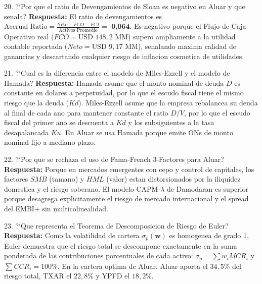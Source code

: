\documentclass[10pt,a4paper]{article}
\theoremstyle{definition}
\begin{document}
\begin{examquestion}{20. ?`Por que el ratio de Devengamientos de Sloan es negativo en Aluar y que senala?}
\textbf{Respuesta:} El ratio de devengamientos es $\text{Accrual Ratio} = \frac{\text{Neto} - FCO - FCI}{\text{Activos Promedio}} = \textbf{-0,064}$. Es negativo porque el Flujo de Caja Operativo real ($FCO = \text{USD } 148,2\text{ MM}$) supero ampliamente a la utilidad contable reportada ($Neto = \text{USD } 9,17\text{ MM}$), senalando maxima calidad de ganancias y descartando cualquier riesgo de inflacion cosmetica de utilidades.
\end{examquestion}

\begin{examquestion}{21. ?`Cual es la diferencia entre el modelo de Miles-Ezzell y el modelo de Hamada?}
\textbf{Respuesta:} Hamada asume que el monto nominal de deuda $D$ es constante en dolares a perpetuidad, por lo que el escudo fiscal tiene el mismo riesgo que la deuda ($Kd$). Miles-Ezzell asume que la empresa rebalancea su deuda al final de cada ano para mantener constante el ratio $D/V$, por lo que el escudo fiscal del primer ano se descuenta a $Kd$ y los subsiguientes a la tasa desapalancada $Ku$. En Aluar se usa Hamada porque emite ONs de monto nominal fijo a mediano plazo.
\end{examquestion}

\begin{examquestion}{22. ?`Por que se rechaza el uso de Fama-French 3-Factores para Aluar?}
\textbf{Respuesta:} Porque en mercados emergentes con cepo y control de capitales, los factores $SMB$ (tamano) y $HML$ (valor) estan distorsionados por la iliquidez domestica y el riesgo soberano. El modelo $\text{CAPM-}\lambda$ de Damodaran es superior porque desagrega explicitamente el riesgo de mercado internacional y el spread del EMBI+ sin multicolinealidad.
\end{examquestion}

\begin{examquestion}{23. ?`Que representa el Teorema de Descomposicion de Riesgo de Euler?}
\textbf{Respuesta:} Como la volatilidad de cartera $\sigma_p(\mathbf{w})$ es homogenea de grado 1, Euler demuestra que el riesgo total se descompone exactamente en la suma ponderada de las contribuciones porcentuales de cada activo: $\sigma_p = \sum w_i MCR_i$ y $\sum CCR_i = 100\%$. En la cartera optima de Aluar, Aluar aporta el $34,5\%$ del riesgo total, TXAR el $22,8\%$ y YPFD el $18,2\%$.
\end{examquestion}
\end{document}
